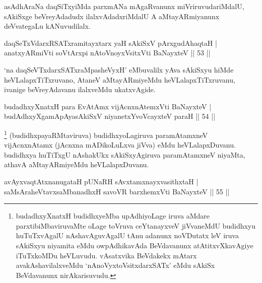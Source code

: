 \begin{artha}
asAdhAraNa daqSiTxyiMda parxmANa mAgaRvanunx miVriruvudariMdalU, sAkiSxge beVreyAdadudx ilalxvAdadxriMdalU A aMtayARmiyanunx deVvategaLu kANuvudilalx.
\end{artha}


\begin{shl}
daqSeTxVdarxRSATxramitayxtarx yaH sAkiSxV pArxgudAhaqtaH |\\
anatxyARmiVti soV\s tArxpi nAtoV\s noyxV\s sitxVti BaNayxteV \hfill || 53 ||
\end{shl}

\begin{artha}
`na daqSeVTxdarxSATxraMpasheVyxH' eMbuvalilx yAva sAkiSxyu hiMde heVLalapxTiTx\-ruvano, AtaneV aMtayARmiyeMdu heVLalapxTiTxruvanu, ivanige beVreyAdavanu ilalx\-veMdu ukatxvAgide.
\end{artha}


\begin{shl}
budadhxyXnatxH para EvA\s \s tAmx vijAcnxnAtemxVti BaNayxteV |\\
budAdhxyXgamApAyasAkiSxV niyanetxYvoVcayxteV paraH \hfill || 54 ||
\end{shl}

\begin{artha}
\footnote[1]{budadhxyXnatxH budidhxyeMba upAdhiyoLage iruva aMdare parxtibiMbaviruvaMte oLage toVruva ceYtanayxveV jiVvaneMdU budidhxyu huTuTxvAgalU nAshavAguvAgalU tAnu adanunx noVDutatx leV iruva sAkiSxyu niyamita eMdu owpAdhikavAda BeVdavanunx atAtitxvXkavAgiye iTuTxkoMDu heVLuvudu. vAsatxvika BeVdakekx mAtarx avakAshavilalxveMdu `nAnoVyxtoV\s sitxdarxSATx' eMdu sAkiSx BeVdavanunx nirAkarisuvudu.} (budidhxpayaRMtaviruva) budidhxyoLagiruva paramAtamxneV vijAcnxnAtamx (jAcnxna mADikoLuLxva jiVva) eMdu heVLalapxDuvanu. budidhxya huTiTxgU nAshakUkx sAkiSxyAgiruva paramAtamxneV niyaMta, athavA aMtayARmiyeMdu heVLalapxDuvanu.
\end{artha}


\begin{shl}
avAyxvaqtAtxnanugataH pUNaRH sAvxtamxnayxvasithxtaH |\\
saMsAraheVtavxsaMbanadhxH savoVR barxhemxVti BaNayxteV \hfill || 55 ||
\end{shl}

